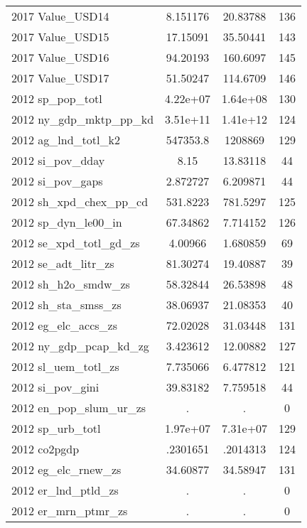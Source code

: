 {\begin{tabular}{l*{1}{ccc}}
2017 Value\_USD14    &    8.151176&    20.83788&         136\\
2017 Value\_USD15    &    17.15091&    35.50441&         143\\
2017 Value\_USD16    &    94.20193&    160.6097&         145\\
2017 Value\_USD17    &    51.50247&    114.6709&         146\\
2012 sp\_pop\_totl    &    4.22e+07&    1.64e+08&         130\\
2012 ny\_gdp\_mktp\_pp\_kd&    3.51e+11&    1.41e+12&         124\\
2012 ag\_lnd\_totl\_k2 &    547353.8&     1208869&         129\\
2012 si\_pov\_dday    &        8.15&    13.83118&          44\\
2012 si\_pov\_gaps    &    2.872727&    6.209871&          44\\
2012 sh\_xpd\_chex\_pp\_cd&    531.8223&    781.5297&         125\\
2012 sp\_dyn\_le00\_in &    67.34862&    7.714152&         126\\
2012 se\_xpd\_totl\_gd\_zs&     4.00966&    1.680859&          69\\
2012 se\_adt\_litr\_zs &    81.30274&    19.40887&          39\\
2012 sh\_h2o\_smdw\_zs &    58.32844&    26.53898&          48\\
2012 sh\_sta\_smss\_zs &    38.06937&    21.08353&          40\\
2012 eg\_elc\_accs\_zs &    72.02028&    31.03448&         131\\
2012 ny\_gdp\_pcap\_kd\_zg&    3.423612&    12.00882&         127\\
2012 sl\_uem\_totl\_zs &    7.735066&    6.477812&         121\\
2012 si\_pov\_gini    &    39.83182&    7.759518&          44\\
2012 en\_pop\_slum\_ur\_zs&           .&           .&           0\\
2012 sp\_urb\_totl    &    1.97e+07&    7.31e+07&         129\\
2012 co2pgdp        &    .2301651&    .2014313&         124\\
2012 eg\_elc\_rnew\_zs &    34.60877&    34.58947&         131\\
2012 er\_lnd\_ptld\_zs &           .&           .&           0\\
2012 er\_mrn\_ptmr\_zs &           .&           .&           0\\

\end{tabular}}
